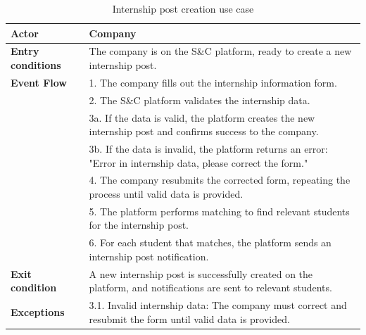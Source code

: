 \begin{table}[h!]
    \centering
    \begin{tabular}{lp{10cm}}
        \textbf{Actor} & Company \\ \hline
        \textbf{Entry conditions} & The company is on the S\&C platform, ready to create a new internship post. \\ \hline
        \textbf{Event Flow} & 
        1. The company fills out the internship information form. \\
        & 2. The S\&C platform validates the internship data. \\
        & 3a. If the data is valid, the platform creates the new internship post and confirms success to the company. \\
        & 3b. If the data is invalid, the platform returns an error: "Error in internship data, please correct the form." \\
        & 4. The company resubmits the corrected form, repeating the process until valid data is provided. \\
        & 5. The platform performs matching to find relevant students for the internship post. \\
        & 6. For each student that matches, the platform sends an internship post notification. \\
        \hline
        \textbf{Exit condition} & A new internship post is successfully created on the platform, and notifications are sent to relevant students. \\ \hline
        \textbf{Exceptions} & 
        3.1. Invalid internship data: The company must correct and resubmit the form until valid data is provided. \\
    \end{tabular}
    \caption{Internship post creation use case}
    \label{tab:internship_post_creation}
\end{table}



